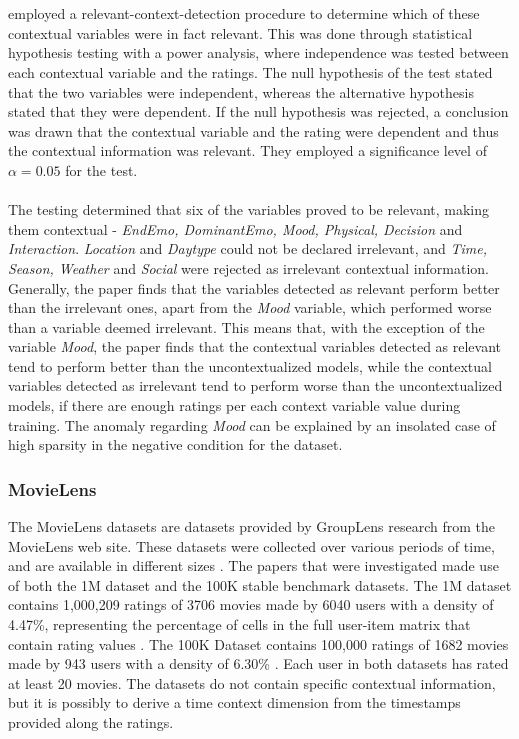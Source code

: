 \\\\
\cite{COMODA2013} employed a relevant-context-detection procedure to determine which of these contextual variables were in fact relevant.
This was done through statistical hypothesis testing with a power analysis, where independence was tested between each contextual variable and the ratings.
The null hypothesis of the test stated that the two variables were independent, whereas the alternative hypothesis stated that they were dependent.
If the null hypothesis was rejected, a conclusion was drawn that the contextual variable and the rating were dependent and thus the contextual information was relevant.
They employed a significance level of $\alpha = 0.05$ for the test.
\\\\
The testing determined that six of the variables proved to be relevant, making them contextual - \textit{EndEmo, DominantEmo, Mood, Physical, Decision} and \textit{Interaction}.
\textit{Location} and \textit{Daytype} could not be declared irrelevant, and \textit{Time, Season, Weather} and \textit{Social} were rejected as irrelevant contextual information.
Generally, the paper finds that the variables detected as relevant perform better than the irrelevant ones, apart from the \textit{Mood} variable, which performed worse than a variable deemed irrelevant.
This means that, with the exception of the variable \textit{Mood}, the paper finds that the contextual variables detected as relevant tend to perform better than the uncontextualized models, while the contextual variables detected as irrelevant tend to perform worse than the uncontextualized models, if there are enough ratings per each context variable value during training.
The anomaly regarding \textit{Mood} can be explained by an insolated case of high sparsity in the negative condition for the dataset.

\subsubsection{MovieLens}
The MovieLens datasets are datasets provided by GroupLens research from the MovieLens web site.
These datasets were collected over various periods of time, and are available in different sizes \cite{movielens}.
The papers that were investigated made use of both the 1M dataset and the 100K stable benchmark datasets.
The 1M dataset contains 1,000,209 ratings of 3706 movies made by 6040 users with a density of 4.47\%, representing the percentage of cells in the full user-item matrix that contain rating values \cite{MovieLens2015}.
The 100K Dataset contains 100,000 ratings of 1682 movies made by 943 users with a density of 6.30\% \cite{MovieLens2015}.
Each user in both datasets has rated at least 20 movies.
The datasets do not contain specific contextual information, but it is possibly to derive a time context dimension from the timestamps provided along the ratings.

